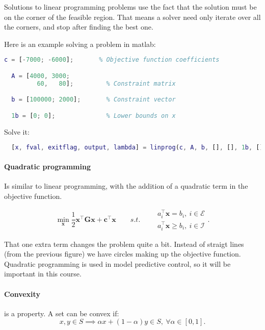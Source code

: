 \documentclass{article}
\begin{document}
\medskip


Solutions to linear programming problems use the fact that the solution must be on the corner of the feasible region. That means
a solver need only iterate over all the corners, and stop after finding the best one.

\medskip


Here is an example solving a problem in matlab:

\begin{lstlisting}[language=Matlab]
  c = [-7000; -6000];       % Objective function coefficients

  A = [4000, 3000; 
         60,   80];         % Constraint matrix

  b = [100000; 2000];       % Constraint vector

  1b = [0; 0];              % Lower bounds on x
\end{lstlisting}

Solve it:

\begin{lstlisting}[language=Matlab]
  % Solve optimization problem:
  [x, fval, exitflag, output, lambda] = linprog(c, A, b, [], [], 1b, []); 
\end{lstlisting}

\paragraph{Quadratic programming} Is similar to linear programming, with the addition of a quadratic term in the
objective function.

\[
  \min_{\mathbf{x}} \frac{1}{2}\mathbf{x}^{\top}\mathbf{Gx} + \mathbf{c^{\top}x} \qquad s.t. \qquad
  \begin{aligned}
    a_i^{\top}\mathbf{x} = b_i,\ i\in \mathcal{E} \\
    a_i^{\top}\mathbf{x} \geq b_i,\ i\in \mathcal{I}
  \end{aligned}
  .\]

That one extra term changes the problem quite a bit. Instead of straigt lines (from the previous figure) we have circles making up
the objective function. Quadratic programming is used in model predictive control, so it will be important in this course.

\paragraph{Convexity} is a property. A set can be convex if: 
\[
  x, y \in S \implies \alpha x + (1 - \alpha)y \in S,\ \forall\alpha\in [ 0,1]
.\]  
\end{document}
